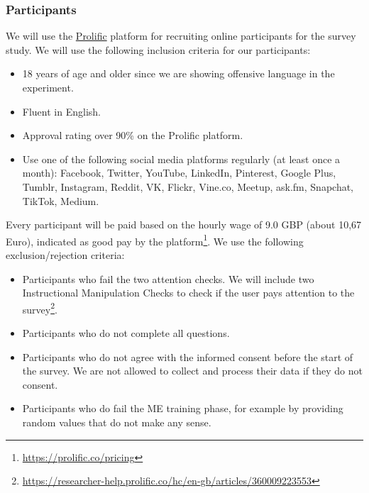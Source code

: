 \subsubsection{Participants}
We will use the \href{https://prolific.co}{Prolific} platform for recruiting online participants for the survey study.
%
We will use the following inclusion criteria for our participants:
\begin{itemize}
    \item 18 years of age and older since we are showing offensive language in the experiment.
    \item Fluent in English.
    \item Approval rating over 90\% on the Prolific platform.
    \item Use one of the following social media platforms regularly (at least once a month): Facebook, Twitter, YouTube, LinkedIn, Pinterest, Google Plus, Tumblr, Instagram, Reddit, VK, Flickr, Vine.co, Meetup, ask.fm, Snapchat, TikTok, Medium.
\end{itemize}
%
Every participant will be paid based on the hourly wage of 9.0 GBP (about 10,67 Euro), indicated as good pay by the platform\footnote{\url{https://prolific.co/pricing}}.
%
We use the following exclusion/rejection criteria:
\begin{itemize}
    \item Participants who fail the two attention checks. We will include two Instructional Manipulation Checks to check if the user pays attention to the survey\footnote{\url{https://researcher-help.prolific.co/hc/en-gb/articles/360009223553}}.
    \item Participants who do not complete all questions.
    \item Participants who do not agree with the informed consent before the start of the survey. We are not allowed to collect and process their data if they do not consent.
    \item Participants who do fail the ME training phase, for example by providing random values that do not make any sense.
\end{itemize}

